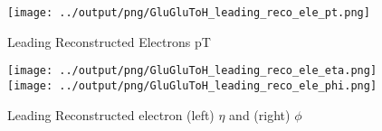 \documentclass[11pt]{book}
\begin{document}
\begin{figure}[ht]
\centering
\texttt{[image: ../output/png/GluGluToH\_leading\_reco\_ele\_pt.png]}
\caption{Leading Reconstructed Electrons pT}
\label{fig:gluglu_leading_reco_ele_pt}
\end{figure}

\begin{figure}[ht]
\centering
\texttt{[image: ../output/png/GluGluToH\_leading\_reco\_ele\_eta.png]}
\texttt{[image: ../output/png/GluGluToH\_leading\_reco\_ele\_phi.png]}
\caption{Leading Reconstructed electron (left) $\eta$ and (right) $\phi$}
\label{fig:gluglu_leading_reco_ele_eta_phi}
\end{figure}


 
\end{document}
